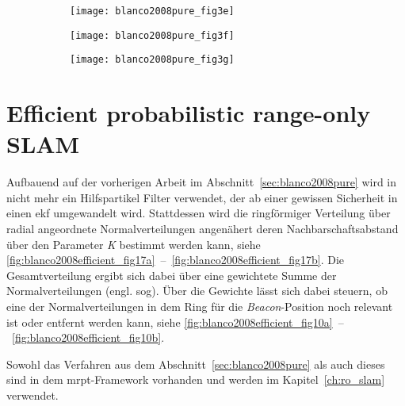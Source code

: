 \begin{figure}
	\begin{subfigure}[t]{0.3\linewidth}
		\texttt{[image: blanco2008pure\_fig3e]}
		\caption{}
		\label{fig:blanco2008pure_fig3e}
	\end{subfigure}
	\hfill
	\begin{subfigure}[t]{0.3\linewidth}
		\texttt{[image: blanco2008pure\_fig3f]}
		\caption{}
		\label{fig:blanco2008pure_fig3f}
	\end{subfigure}
	\hfill
	\begin{subfigure}[t]{0.3\linewidth}
		\texttt{[image: blanco2008pure\_fig3g]}
		\caption{}
		\label{fig:blanco2008pure_fig3g}
	\end{subfigure}
	\label{fig:blanco2008pure_fig3}
\end{figure}


%
%
\section{Efficient probabilistic range-only SLAM}\label{sec:blanco2008efficient}

Aufbauend auf der vorherigen Arbeit im Abschnitt~\ref{sec:blanco2008pure} wird in  \cite{blanco2008efficient} nicht mehr ein Hilfspartikel Filter verwendet, der ab einer gewissen Sicherheit in einen \Gls{ekf} umgewandelt wird. Stattdessen wird die ringförmiger Verteilung über radial angeordnete Normalverteilungen angenähert deren Nachbarschaftsabstand über den Parameter \textit{K} bestimmt werden kann, siehe \autoref{fig:blanco2008efficient_fig17a}~--~\ref{fig:blanco2008efficient_fig17b}. Die Gesamtverteilung ergibt sich dabei über eine gewichtete Summe der Normalverteilungen (engl. \gls{sog}). Über die Gewichte lässt sich dabei steuern, ob eine der Normalverteilungen in dem Ring für die \textit{Beacon}-Position noch relevant ist oder entfernt werden kann, siehe \autoref{fig:blanco2008efficient_fig10a}~--~\ref{fig:blanco2008efficient_fig10b}.

Sowohl das Verfahren aus dem Abschnitt~\ref{sec:blanco2008pure} als auch dieses sind in dem \Gls{mrpt}-Framework vorhanden und werden im Kapitel~\ref{ch:ro_slam} verwendet.

